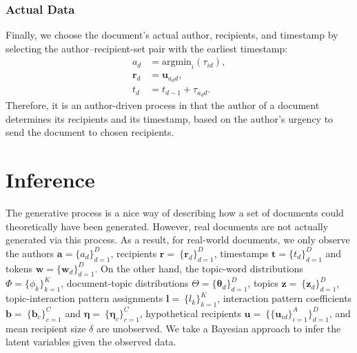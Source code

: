 \documentclass{article}
\begin{document}
\subsubsection{Actual Data}\label{subsubsec:Actual Data}
Finally, we choose the document's actual author, recipients, and timestamp by selecting the author--recipient-set pair with the earliest timestamp:
\begin{align*}
a_d &= \mbox{argmin}_{i}(\tau_{id}),\\
\boldsymbol{r}_d &= \boldsymbol{u}_{a_d d},\\
t_d &=t_{d-1} + \tau_{a_d d}.
\end{align*}
Therefore, it is an author-driven process in that the author of a document determines its recipients and its timestamp, based on the author's urgency to send the document to chosen recipients. 

\section{Inference}\label{sec:Inference}
The generative process is a nice way of describing how a set of documents could theoretically have been generated. However,
real documents are not actually generated via this process. As a result, for real-world documents, we only observe the authors $\boldsymbol{a}= \{a_d\}_{d=1}^D$, recipients $\boldsymbol{r}=\ \{\boldsymbol{r}_d\}_{d=1}^D$, timestamps $\boldsymbol{t}= \{t_d\}_{d=1}^D$ and tokens $\boldsymbol{w}= \{\boldsymbol{w}_d\}_{d=1}^D$. On the other hand, the topic-word distributions $\Phi =  \{\phi_k\}_{k=1}^K$, document-topic distributions $\Theta = \{\boldsymbol{\theta}_d\}_{d=1}^D$, topics $\boldsymbol{z}=\ \{\boldsymbol{z}_d\}_{d=1}^D$, topic-interaction pattern assignments $\boldsymbol{l}=\ \{l_k\}_{k=1}^K$, interaction pattern coefficients $\boldsymbol{b}=\ \{\boldsymbol{b}_c\}_{c=1}^C$ and $\boldsymbol{\eta}=\ \{\boldsymbol{\eta}_c\}_{c=1}^C$, hypothetical recipients $\boldsymbol{u}=\ \{\{\boldsymbol{u}_{id}\}_{i=1}^A\}_{d=1}^D$, and mean recipient size $\delta$ are unobserved. We take a Bayesian approach to infer the latent variables given the observed data. 
\end{document}
